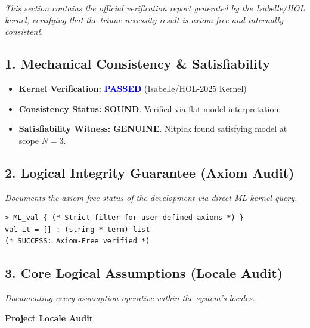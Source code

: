 \documentclass[a4paper, 11pt]{article}
\theoremstyle{plain}
\theoremstyle{definition}
\begin{document}
\noindent\textit{This section contains the official verification report generated by the Isabelle/HOL kernel, certifying that the triune necessity result is axiom-free and internally consistent.}

\vspace{1em}

\begin{mdframed}[linecolor=black, linewidth=1.5pt, roundcorner=10pt, backgroundcolor=gray!5]
\subsection*{1. Mechanical Consistency \& Satisfiability}
\begin{itemize}
    \item \textbf{Kernel Verification:} \textcolor{blue}{\textbf{PASSED}} (Isabelle/HOL-2025 Kernel)
    \item \textbf{Consistency Status:} \textbf{SOUND}. Verified via flat-model interpretation.
    \item \textbf{Satisfiability Witness:} \textbf{GENUINE}. Nitpick found satisfying model at scope $N=3$.
\end{itemize}

\subsection*{2. Logical Integrity Guarantee (Axiom Audit)}
\textit{Documents the axiom-free status of the development via direct ML kernel query.}
\begin{mdframed}[linecolor=black, linewidth=1pt, backgroundcolor=white]
\begin{lstlisting}[basicstyle=\small\ttfamily]
> ML_val { (* Strict filter for user-defined axioms *) }
val it = [] : (string * term) list
(* SUCCESS: Axiom-Free verified *)
\end{lstlisting}
\end{mdframed}

\subsection*{3. Core Logical Assumptions (Locale Audit)}
\textit{Documenting every assumption operative within the system's locales.}

\begin{center}
    \textbf{Project Locale Audit}
\end{center}

\vspace{0.5em}
\end{mdframed}
\end{document}
